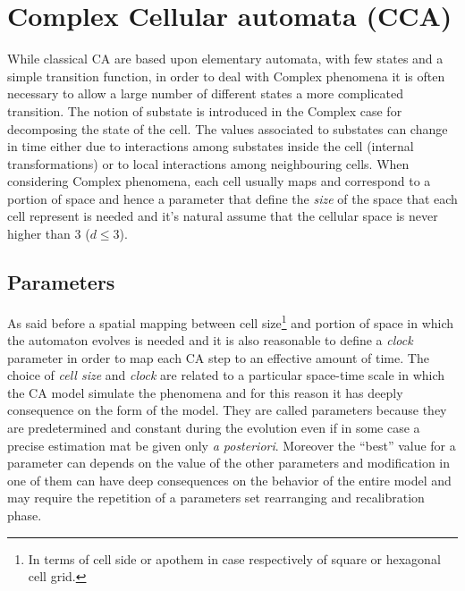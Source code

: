 \section{Complex Cellular automata (CCA)}
While classical CA are based upon elementary automata, with few states and a
simple transition function, in order to deal with Complex phenomena it is
often necessary to allow a large number of different states a more complicated
transition. The notion of substate is introduced in the Complex case for
decomposing the state of the cell. The values associated to substates can change
in time either due to interactions among substates inside the cell (internal
transformations) or to local interactions among neighbouring cells.
When considering Complex phenomena, each cell usually maps and correspond to
a portion of space and hence a parameter that define the \emph{size }of the
space that each cell represent is needed and it's natural assume that
the cellular space is never higher than 3 (\begin{math}d \leq 3\end{math}).

\subsection{Parameters}
As said before a spatial mapping between cell size\footnote{In terms of cell
side or apothem in case respectively of square or hexagonal cell grid.} and
portion of space in which the automaton evolves is needed and it is also
reasonable to define a \emph{clock} parameter in order to map each CA step to an
effective amount of time. The choice of \emph{cell size} and \emph{clock} are
related to a particular space-time scale in which the CA model simulate the
phenomena and for this reason it has deeply consequence on the form of the model.
They are called parameters because they are predetermined and constant during
the evolution even if in some case a precise estimation mat be given only
\textit{a posteriori}. Moreover the ``best'' value for a parameter can depends 
on the value of the other parameters and modification in one of them  can have
deep consequences on the behavior of the entire model and may require the
repetition of a parameters set rearranging and recalibration phase.


